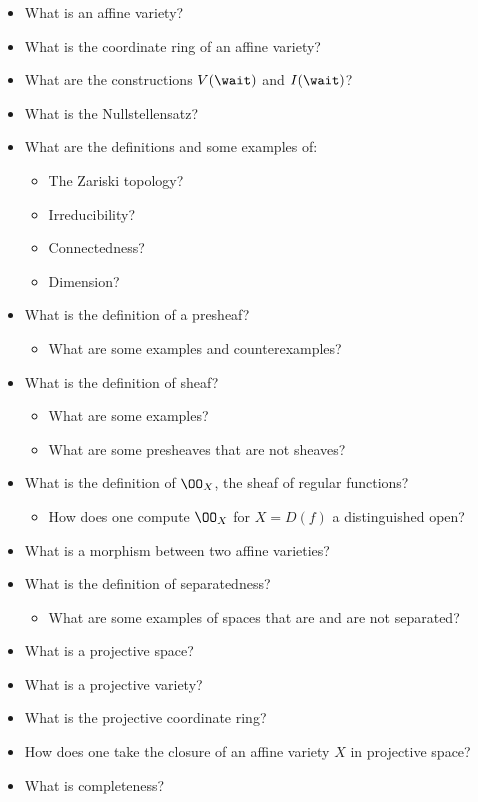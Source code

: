 \begin{itemize}
\tightlist
\item
  What is an affine variety?
\item
  What is the coordinate ring of an affine variety?
\item
  What are the constructions \(V(\wait)\) and \(I(\wait)\)?
\item
  What is the Nullstellensatz?
\item
  What are the definitions and some examples of:

  \begin{itemize}
  \tightlist
  \item
    The Zariski topology?
  \item
    Irreducibility?
  \item
    Connectedness?
  \item
    Dimension?
  \end{itemize}
\item
  What is the definition of a presheaf?

  \begin{itemize}
  \tightlist
  \item
    What are some examples and counterexamples?
  \end{itemize}
\item
  What is the definition of sheaf?

  \begin{itemize}
  \tightlist
  \item
    What are some examples?
  \item
    What are some presheaves that are not sheaves?
  \end{itemize}
\item
  What is the definition of \(\OO_X\), the sheaf of regular functions?

  \begin{itemize}
  \tightlist
  \item
    How does one compute \(\OO_X\) for \(X = D(f)\) a distinguished
    open?
  \end{itemize}
\item
  What is a morphism between two affine varieties?
\item
  What is the definition of separatedness?

  \begin{itemize}
  \tightlist
  \item
    What are some examples of spaces that are and are not separated?
  \end{itemize}
\item
  What is a projective space?
\item
  What is a projective variety?
\item
  What is the projective coordinate ring?
\item
  How does one take the closure of an affine variety \(X\) in projective
  space?
\item
  What is completeness?


\end{itemize}
